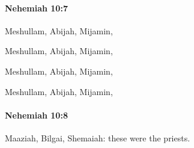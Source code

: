 		\paragraph{Nehemiah 10:7} %
			\label{NEHEMIAH-10-7}

			Meshullam, Abijah, Mijamin,

			\begin{versebox}
					\item[BHS] 
					\item[LXX] 
					\item[ASV] Meshullam, Abijah, Mijamin,
					\item[NIV] Meshullam, Abijah, Mijamin,
					\item[NRSV] Meshullam, Abijah, Mijamin,
			\end{versebox}

		\paragraph{Nehemiah 10:8} %
			\label{NEHEMIAH-10-8}

			Maaziah, Bilgai, Shemaiah: these were the priests.

